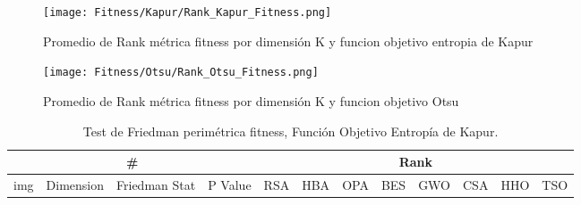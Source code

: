 \documentclass[conference]{IEEEtran}
\begin{document}
\begin{figure}[!htb]
    \centering
    \texttt{[image: Fitness/Kapur/Rank\_Kapur\_Fitness.png]}
    \caption{Promedio de Rank métrica fitness por dimensión K y funcion objetivo entropia de Kapur}
    \label{fig:fig510}
\end{figure}
\begin{figure}[!htb]
	\centering
	\texttt{[image: Fitness/Otsu/Rank\_Otsu\_Fitness.png]}
	\caption{Promedio de Rank métrica fitness por dimensión K y funcion objetivo Otsu}
	\label{fig:fig510}
\end{figure}
\begin{table}[]
	\centering
	\caption{Test de Friedman perimétrica fitness, Función Objetivo Entropía de Kapur.} 
	\begin{tabular}{|llll|llllllll|}
		\hline
		\multicolumn{4}{|c|}{\#} & \multicolumn{8}{c|}{Rank} \\ \hline
		\multicolumn{1}{|l|}{img} & \multicolumn{1}{l|}{Dimension} & \multicolumn{1}{l|}{Friedman Stat} & P Value & \multicolumn{1}{l|}{RSA} & \multicolumn{1}{l|}{HBA} & \multicolumn{1}{l|}{OPA} & \multicolumn{1}{l|}{BES} & \multicolumn{1}{l|}{GWO} & \multicolumn{1}{l|}{CSA} & \multicolumn{1}{l|}{HHO} & TSO \\ \hline 


\end{tabular}
\end{table}
\end{document}
